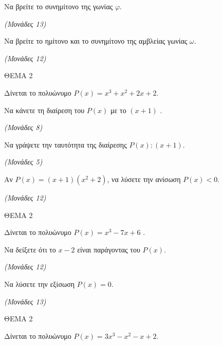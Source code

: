 \documentclass[11pt,a4paper,twoside]{book}
\newcommand{\monades}[1]{\hfill \textit{(Μονάδες #1)}}
\begin{document}
\begin{alist}
\item Να βρείτε το συνημίτονο της γωνίας $\varphi$.

\monades{13}

\item Να βρείτε το ημίτονο και το συνημίτονο της αμβλείας γωνίας $\omega$.

\monades{12}
\end{alist}

\vspace{4mm}

ΘΕΜΑ 2

Δίνεται το πολυώνυμο $P(x) = x^3 + x^2 + 2x + 2$.

\begin{alist}
\item

\begin{rlist}
\item Να κάνετε τη διαίρεση του $P(x)$ με το $(x + 1)$ .

\monades{8}

\item Να γράψετε την ταυτότητα της διαίρεσης $P(x) : (x + 1)$.

\monades{5}

\end{rlist}
\item Aν $P(x) = (x + 1)(x^2 + 2)$, να λύσετε την ανίσωση $P(x) < 0$.

\monades{12}
\end{alist}

\vspace{4mm}

ΘΕΜΑ 2

Δίνεται το πολυώνυμο $P(x) = x^3 - 7x + 6$ .

\begin{alist}
\item Να δείξετε ότι το $x - 2$ είναι παράγοντας του $P(x)$.

\monades{12}

\item Να λύσετε την εξίσωση $P(x) = 0$.

\monades{13}
\end{alist}

\vspace{4mm}

ΘΕΜΑ 2

Δίνεται το πολυώνυμο $P(x) = 3x^3 - x^2 - x + 2$.
\end{document}

